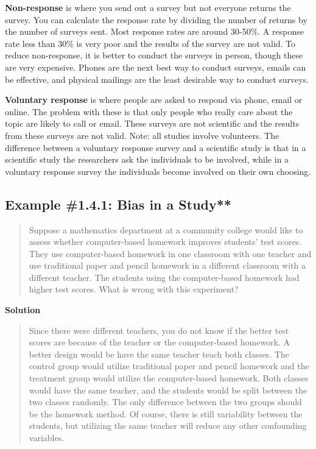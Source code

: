 \documentclass[]{book}
\begin{document}
\textbf{Non-response} is where you send out a survey but not everyone returns
the survey. You can calculate the response rate by dividing the number
of returns by the number of surveys sent. Most response rates are around
30-50\%. A response rate less than 30\% is very poor and the results of
the survey are not valid. To reduce non-response, it is better to
conduct the surveys in person, though these are very expensive. Phones
are the next best way to conduct surveys, emails can be effective, and
physical mailings are the least desirable way to conduct surveys.

\textbf{Voluntary response} is where people are asked to respond via phone,
email or online. The problem with these is that only people who really
care about the topic are likely to call or email. These surveys are not
scientific and the results from these surveys are not valid. Note: all
studies involve volunteers. The difference between a voluntary response
survey and a scientific study is that in a scientific study the
researchers ask the individuals to be involved, while in a voluntary
response survey the individuals become involved on their own choosing.

\hypertarget{example-1.4.1-bias-in-a-study}{%
\subsection{Example \#1.4.1: Bias in a Study**}\label{example-1.4.1-bias-in-a-study}}

\begin{quote}
Suppose a mathematics department at a community college would like to
assess whether computer-based homework improves students' test scores.
They use computer-based homework in one classroom with one teacher and
use traditional paper and pencil homework in a different classroom
with a different teacher. The students using the computer-based
homework had higher test scores. What is wrong with this experiment?
\end{quote}

\textbf{Solution}

\begin{quote}
Since there were different teachers, you do not know if the better
test scores are because of the teacher or the computer-based homework.
A better design would be have the same teacher teach both classes. The
control group would utilize traditional paper and pencil homework and
the treatment group would utilize the computer-based homework. Both
classes would have the same teacher, and the students would be split
between the two classes randomly. The only difference between the two
groups should be the homework method. Of course, there is still
variability between the students, but utilizing the same teacher will
reduce any other confounding variables.
\end{quote}
\end{document}
